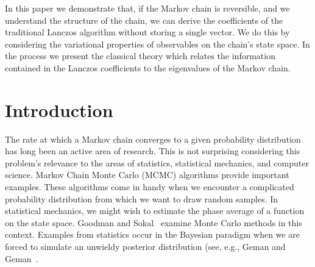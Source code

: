 \documentclass[12pt,letterpaper]{report}
\theoremstyle{plain}
\theoremstyle{definition}
\theoremstyle{remark}
\numberwithin{theorem}{chapter}
\numberwithin{claim}{chapter}
\numberwithin{equation}{chapter}
\numberwithin{conjecture}{chapter}
\newcommand\<{\ensuremath{\langle}}
\renewcommand\>{\ensuremath{\rangle}}
\begin{document}
In this paper we demonstrate that, if the Markov chain is reversible, and we
understand the structure of the chain, we can derive the coefficients of the
traditional Lanczos algorithm without storing a single vector. We do this by
considering the variational properties of observables on the chain's state
space. In the process we present the classical theory which relates the
information contained in the Lanczos coefficients to the eigenvalues of the
Markov chain. 

\newpage
\tableofcontents

\newpage



\section*{Introduction}
The rate at which a Markov chain converges to a given probability distribution
has long been an active area of research. This is not surprising considering
this problem's relevance to the areas of statistics, statistical mechanics, and
computer science. Markov Chain Monte Carlo (MCMC) algorithms provide important
examples. These algorithms come in handy when we encounter a complicated
probability distribution from which we want to draw random samples. In
statistical mechanics, we might wish to estimate the phase average of a function
on the state space. Goodman and Sokal~\cite{GoodmanSokal:1989} examine Monte
Carlo methods in this context. Examples from statistics occur in the Bayesian
paradigm when we are forced to simulate an unwieldy posterior distribution (see,
e.g., Geman and Geman~\cite{Geman:1984}.  
\end{document}
